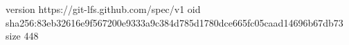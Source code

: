version https://git-lfs.github.com/spec/v1
oid sha256:83eb32616e9f567200e9333a9c384d785d1780dce665fc05caad14696b67db73
size 448
